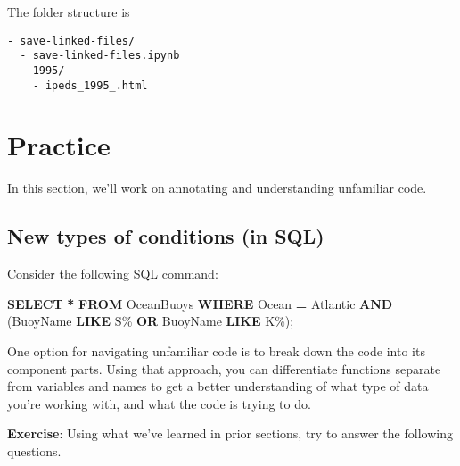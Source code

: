 \documentclass[
]{book}
\newenvironment{Shaded}{\begin{snugshade}}{\end{snugshade}}
\newcommand{\KeywordTok}[1]{\textcolor[rgb]{0.13,0.29,0.53}{\textbf{#1}}}
\newcommand{\NormalTok}[1]{#1}
\newcommand{\OperatorTok}[1]{\textcolor[rgb]{0.81,0.36,0.00}{\textbf{#1}}}
\newcommand{\StringTok}[1]{\textcolor[rgb]{0.31,0.60,0.02}{#1}}
\begin{document}
The folder structure is

\begin{verbatim}
- save-linked-files/
  - save-linked-files.ipynb
  - 1995/
    - ipeds_1995_.html
\end{verbatim}

\chapter{Practice}\label{practice}

In this section, we'll work on annotating and understanding unfamiliar code.

\section{New types of conditions (in SQL)}\label{new-types-of-conditions-in-sql}

Consider the following SQL command:

\begin{Shaded}
\begin{Highlighting}[]
\KeywordTok{SELECT} \OperatorTok{*} \KeywordTok{FROM}\NormalTok{ OceanBuoys}
\KeywordTok{WHERE}\NormalTok{ Ocean }\OperatorTok{=} \StringTok{\textquotesingle{}Atlantic\textquotesingle{}} \KeywordTok{AND}\NormalTok{ (BuoyName }\KeywordTok{LIKE} \StringTok{\textquotesingle{}S\%\textquotesingle{}} \KeywordTok{OR}\NormalTok{ BuoyName }\KeywordTok{LIKE} \StringTok{\textquotesingle{}K\%\textquotesingle{}}\NormalTok{);}
\end{Highlighting}
\end{Shaded}

One option for navigating unfamiliar code is to break down the code into its
component parts. Using that approach, you can differentiate functions separate from variables and names to get a better understanding of what type of data you're working with, and what the code is trying to do.

\textbf{Exercise}: Using what we've learned in prior sections, try to answer the following questions.
\end{document}
